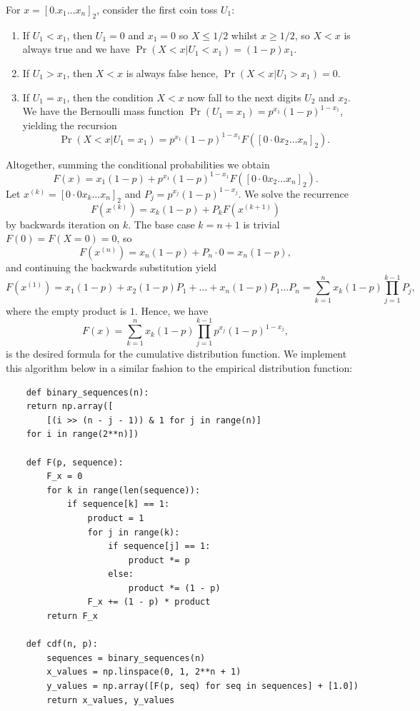 \documentclass{article}
\begin{document}
For \(x = [0.x_1 \dots x_n]_2\), consider the first coin toss \(U_1\):
\begin{enumerate}
    \item If \(U_1 < x_1\), then \(U_1 = 0\) and \(x_1 = 0\) so \(X \leq 1/2\) whilst \(x \geq 1/2\), so \(X < x\) is always true and we have \(\Pr(X < x \vert U_1 < x_1) = (1-p)x_1\).
    \item If \(U_1 > x_1\), then \(X < x\) is always false hence, \(\Pr(X < x | U_1 > x_1) = 0\).
    \item If \(U_1 = x_1\), then the condition \(X < x\) now fall to the next digits \(U_2\) and \(x_2\). We have the Bernoulli mass function \(\Pr(U_1 = x_1) = p^{x_1}(1-p)^{1-x_1}\), yielding the recursion
    \[ \Pr(X < x | U_1 = x_1) = p^{x_1}(1-p)^{1-x_1}F([0 \cdot 0x_2 \dots x_n]_2). \]
\end{enumerate}
Altogether, summing the conditional probabilities we obtain
\[ F(x) = x_1(1-p) + p^{x_1}(1-p)^{1-x_1}F([0 \cdot 0x_2 \dots x_n]_2). \]
Let \(x^{(k)} = [0 \cdot 0x_k \dots x_n]_2\) and \(P_j = p^{x_j}(1-p)^{1-x_j}\). We solve the recurrence
\[ F(x^{(k)}) = x_k(1-p) + P_kF(x^{(k+1)}) \]
by backwards iteration on \(k\). The base case \(k = n+1\) is trivial \(F(0) = F(X = 0) = 0\), so
\[ F(x^{(n)}) = x_n(1-p) + P_n\cdot 0 = x_n(1-p), \]
and continuing the backwards substitution yield
\[ F(x^{(1)}) = x_1(1-p) + x_2(1-p)P_1 + \dots + x_n(1-p)P_1 \dots P_n = \sum_{k=1}^n x_k(1-p)\prod_{j=1}^{k-1} P_j, \]
where the empty product is \(1\). Hence, we have
\[ F(x) = \sum_{k=1}^n x_k(1-p)\prod_{j=1}^{k-1} p^{x_j}(1-p)^{1-x_j}, \]
is the desired formula for the cumulative distribution function. We implement this algorithm below in a similar fashion to the empirical distribution function:

\begin{verbatim}
    def binary_sequences(n):
    return np.array([
        [(i >> (n - j - 1)) & 1 for j in range(n)] 
    for i in range(2**n)])

    def F(p, sequence):
        F_x = 0
        for k in range(len(sequence)):
            if sequence[k] == 1:
                product = 1
                for j in range(k):
                    if sequence[j] == 1:
                        product *= p
                    else:
                        product *= (1 - p)
                F_x += (1 - p) * product
        return F_x
    
    def cdf(n, p):
        sequences = binary_sequences(n)
        x_values = np.linspace(0, 1, 2**n + 1)
        y_values = np.array([F(p, seq) for seq in sequences] + [1.0])
        return x_values, y_values
\end{verbatim}
\end{document}
